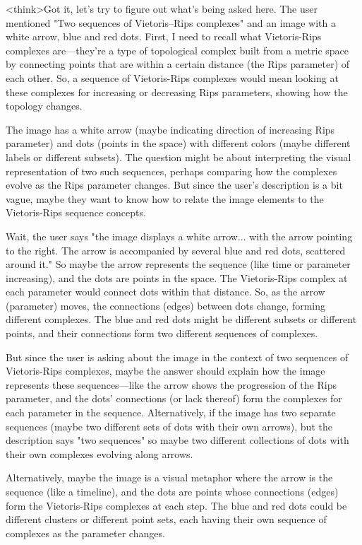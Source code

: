 <think>Got it, let's try to figure out what's being asked here. The user mentioned "Two sequences of Vietoris--Rips complexes" and an image with a white arrow, blue and red dots. First, I need to recall what Vietoris-Rips complexes are—they're a type of topological complex built from a metric space by connecting points that are within a certain distance (the Rips parameter) of each other. So, a sequence of Vietoris-Rips complexes would mean looking at these complexes for increasing or decreasing Rips parameters, showing how the topology changes.

The image has a white arrow (maybe indicating direction of increasing Rips parameter) and dots (points in the space) with different colors (maybe different labels or different subsets). The question might be about interpreting the visual representation of two such sequences, perhaps comparing how the complexes evolve as the Rips parameter changes. But since the user's description is a bit vague, maybe they want to know how to relate the image elements to the Vietoris-Rips sequence concepts.

Wait, the user says "the image displays a white arrow... with the arrow pointing to the right. The arrow is accompanied by several blue and red dots, scattered around it." So maybe the arrow represents the sequence (like time or parameter increasing), and the dots are points in the space. The Vietoris-Rips complex at each parameter would connect dots within that distance. So, as the arrow (parameter) moves, the connections (edges) between dots change, forming different complexes. The blue and red dots might be different subsets or different points, and their connections form two different sequences of complexes.

But since the user is asking about the image in the context of two sequences of Vietoris-Rips complexes, maybe the answer should explain how the image represents these sequences—like the arrow shows the progression of the Rips parameter, and the dots' connections (or lack thereof) form the complexes for each parameter in the sequence. Alternatively, if the image has two separate sequences (maybe two different sets of dots with their own arrows), but the description says "two sequences" so maybe two different collections of dots with their own complexes evolving along arrows.

Alternatively, maybe the image is a visual metaphor where the arrow is the sequence (like a timeline), and the dots are points whose connections (edges) form the Vietoris-Rips complexes at each step. The blue and red dots could be different clusters or different point sets, each having their own sequence of complexes as the parameter changes.

